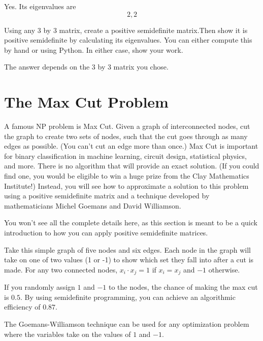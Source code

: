 \begin{Answer}[ref=pos-matrix-01]
Yes. Its eigenvalues are $$2,2$$
\end{Answer}
  
\begin{Exercise}[title={Creating a positive semidefinite matrix}, label=pos-matrix-02]
Using any 3 by 3 matrix, create a positive semidefinite matrix.Then show it is positive semidefinite by calculating its eigenvalues.  You can either compute this by hand or using Python.  In either case, show your work.
\end{Exercise}

\begin{Answer}[ref=pos-matrix-02]
The answer depends on the 3 by 3 matrix you chose.
\end{Answer}

\section{The Max Cut Problem}
A famous NP problem is Max Cut. Given a graph of interconnected nodes, cut the graph to create two sets of nodes, such that the cut goes through as many edges as possible. (You can't cut an edge more than once.) Max Cut is important for binary classification in machine learning, circuit design, statistical physics, and more. There is no algorithm that will provide an exact solution. (If you could find one, you would be eligible to win a huge prize from the Clay Mathematics Institute!) Instead, you will see how to approximate a solution to this  problem using a positive semidefinite matrix and a technique developed by mathematicians Michel Goemans and David Williamson. 

You won't see all the complete details here, as this section is meant to be a quick introduction to how you can apply positive semidefinite matrices. 

Take this simple graph of five nodes and six edges. Each node in the graph will take on one of two values (1 or -1) to show which set they fall into after a cut is made. For any two connected nodes, $x_i\cdot x_j = 1$ if $x_i = x_j$ and $-1$ otherwise.

If you randomly assign $1$ and $-1$ to the nodes, the chance of making the max cut is $0.5$. By using semidefinite programming, you can achieve an algorithmic efficiency of $0.87$. 

The Goemans-Williamson technique can be used for any optimization problem where the variables take on the values of $1$ and $-1$.

